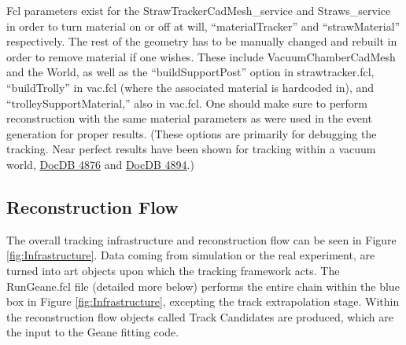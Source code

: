 \documentclass{article}
\begin{document}
    Fcl parameters exist for the StrawTrackerCadMesh\_service and Straws\_service in order to turn material on or off at will, ``materialTracker'' and ``strawMaterial'' respectively. The rest of the geometry has to be manually changed and rebuilt in order to remove material if one wishes. These include VacuumChamberCadMesh and the World, as well as the ``buildSupportPost'' option in strawtracker.fcl, ``buildTrolly'' in vac.fcl (where the associated material is hardcoded in), and ``trolleySupportMaterial,'' also in vac.fcl. One should make sure to perform reconstruction with the same material parameters as were used in the event generation for proper results. (These options are primarily for debugging the tracking. Near perfect results have been shown for tracking within a vacuum world, \href{http://gm2-docdb.fnal.gov:8080/cgi-bin/ShowDocument?docid=4876}{DocDB 4876} and \href{http://gm2-docdb.fnal.gov:8080/cgi-bin/ShowDocument?docid=4894}{DocDB 4894}.)


  \subsection{Reconstruction Flow}

    The overall tracking infrastructure and reconstruction flow can be seen in Figure \ref{fig:Infrastructure}. Data coming from simulation or the real experiment, are turned into art objects upon which the tracking framework acts. The RunGeane.fcl file (detailed more below) performs the entire chain within the blue box in Figure \ref{fig:Infrastructure}, excepting the track extrapolation stage. Within the reconstruction flow objects called Track Candidates are produced, which are the input to the Geane fitting code.
\end{document}
